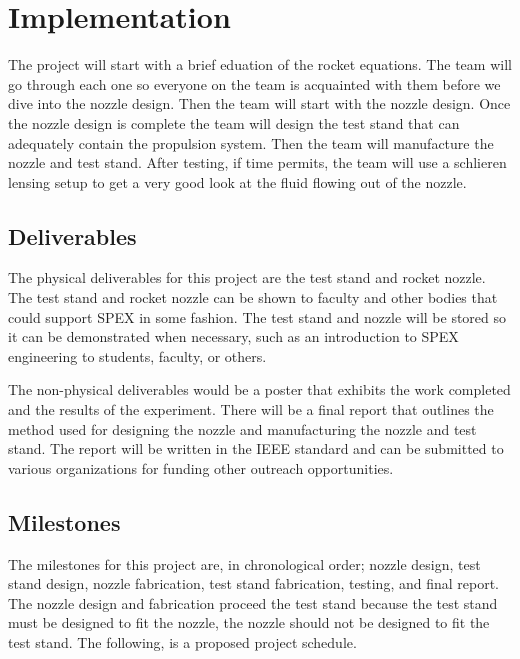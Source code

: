 \documentclass[conference]{IEEEtran} %
\begin{document}
\section{Implementation}\label{sec:implementation}
The project will start with a brief eduation of the rocket equations. The team will go through each one so everyone on the team is acquainted with them before we dive into the
nozzle design. Then the team will start with the nozzle design. Once the nozzle design is complete the team will design the test stand that can adequately contain the
propulsion system. Then the team will manufacture the nozzle and test stand. After testing, if time permits, the team will use a schlieren lensing setup to
get a very good look at the fluid flowing out of the nozzle.

\subsection{Deliverables}\label{subsec:deliverables}
The physical deliverables for this project are the test stand and rocket nozzle. The test stand and rocket nozzle can be shown to faculty and other
bodies that could support SPEX in some fashion. The test stand and nozzle will be stored so it can be demonstrated when necessary, such as an introduction to SPEX
engineering to students, faculty, or others.

The non-physical deliverables would be a poster that exhibits the work completed and the results of the experiment. There will be a final report that outlines
the method used for designing the nozzle and manufacturing the nozzle and test stand. The report will be written in the IEEE standard and can be submitted to various
organizations for funding other outreach opportunities.

\subsection{Milestones}\label{subsec:milestones}
The milestones for this project are, in chronological order; nozzle design, test stand design, nozzle fabrication, test stand fabrication, testing, and final report.
The nozzle design and fabrication proceed the test stand because the test stand must be designed to fit the nozzle, the nozzle should not be designed to fit the test stand.
The following, is a proposed project schedule.
\end{document}
